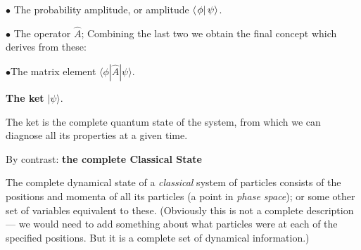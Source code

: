 \item{$\bullet$} The probability amplitude, or amplitude $\left< \left. {\phi} \right| {\psi} \right>$.
\item{$\bullet$} The operator $\hat A$;
\medskip\noi
Combining the last two we obtain the final concept which derives from these:
\medskip
\item{$\bullet$}The matrix element $\langle\phi|\hat
A|\psi\rangle$.\vfil\Eject
{}
\centerline{{\bf The ket} $|\psi\rangle$.}
\noi The ket is the complete quantum state of the system, from which we can
diagnose all its properties at a given time.
\smallskip\noi
\centerline {By contrast: \bf the complete Classical State}
The complete dynamical state of a {\it classical} system of particles consists of
the positions and momenta of all its particles (a point in {\it phase space}); or some other
set of variables equivalent to these. (Obviously this is not a complete
description --- we would need to add something about what particles were at each
of the specified positions. But it is a complete set of dynamical information.)

